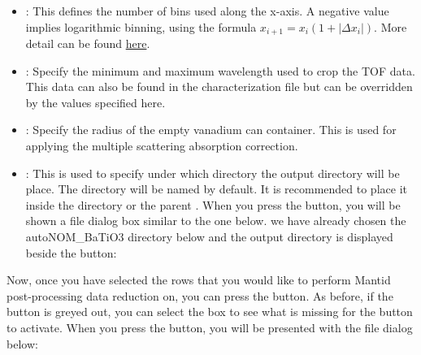 \begin{itemize}
\item {}: This defines the number of bins used along the x-axis. A negative value implies logarithmic binning, using the formula $x_{i+1} = x_i(1+|\Delta x_i|)$. More detail can be found \href{http://docs.mantidproject.org/nightly/algorithms/Rebin-v1.html}{here}.


\item {}: Specify the minimum and maximum wavelength used to crop the TOF data. This data can also be found in the characterization file but can be overridden by the values specified here.

\item {}: Specify the radius of the empty vanadium can container. This is used for applying the multiple scattering absorption correction.

\item {}: This is used to specify under which directory the output directory will be place. The directory will be named  by default. It is recommended to place it inside the  directory or the parent . When you press the  button, you will be shown a file dialog box similar to the one below. we have already chosen the autoNOM\_BaTiO3 directory below and the output directory is displayed beside the  button:

\noindent{}

\end{itemize}

Now, once you have selected the rows that you would like to perform Mantid post-processing data reduction on, you can press the  button. As before, if the button is greyed out, you can select the  box to see what is missing for the button to activate. When you press the  button, you will be presented with the file dialog below:

